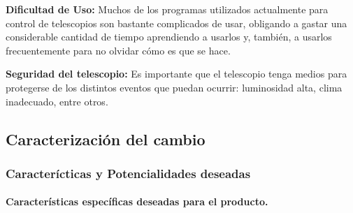 \documentclass[letterpaper,spanish,10pt]{article}
\begin{document}
\textbf{Dificultad de Uso:} Muchos de los programas utilizados actualmente para control 
de telescopios son bastante complicados de usar, obligando a gastar una considerable 
cantidad de tiempo aprendiendo a usarlos y, tambi\'en, a usarlos frecuentemente para no 
olvidar c\'omo es que se hace.

\textbf{Seguridad del telescopio:} Es importante que el telescopio tenga medios para 
protegerse de los distintos eventos que puedan ocurrir: luminosidad alta, clima inadecuado, 
entre otros. 

\newpage

\subsection{Caracterizaci\'on del cambio}
\subsubsection{Caracter\'icticas y Potencialidades deseadas}


\paragraph{Caracter\'isticas espec\'ificas deseadas para el producto.}
\end{document}
